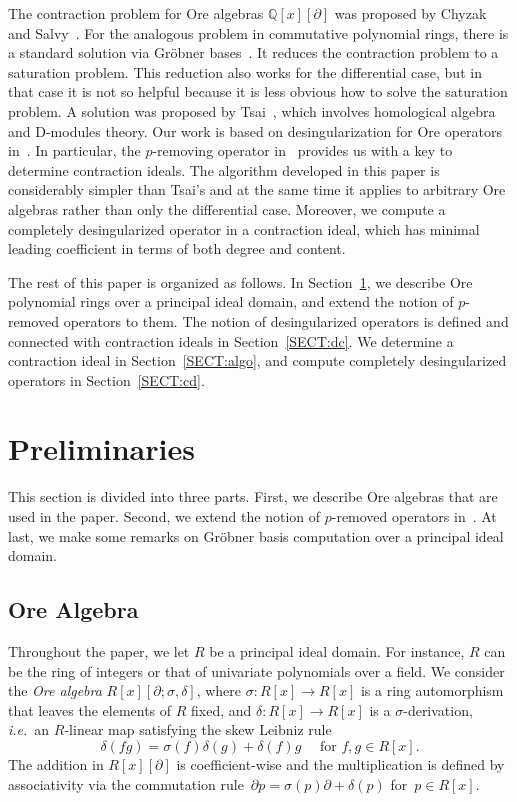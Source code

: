 \documentclass{sig-alternate}
\newcommand{\bQ} { {\mathbb{Q}}}
\newcommand{\pa}{\partial}
\newcommand{\ie}{{\it i.e.}}
\begin{document}
The contraction problem for Ore algebras $\bQ[x][\pa]$ was proposed by Chyzak and Salvy~\cite[Section 4.3]{Salvy1998}.
For the analogous problem in
commutative polynomial rings, there is a standard solution via
Gr\"obner bases~\cite[Section 8.7]{Weispfenning1993}. It reduces the contraction problem to
a saturation problem. This reduction also works for the differential
case, but in that case it is not so helpful because it is less obvious
how to solve the saturation problem. A solution was proposed by
Tsai~\cite{Tsai2000}, which involves homological algebra and D-modules theory.
Our work is based on desingularization for Ore operators in~\cite{Chen2013,Chen2016}.
In particular, the $p$-removing operator in~\cite[Lemma~4]{Chen2016} provides us with a key
to determine contraction ideals. The algorithm developed in this paper is
considerably simpler than Tsai's and at the same time it applies to
arbitrary Ore algebras rather than only the differential case.
Moreover, we compute a completely desingularized operator in a contraction ideal, which
has minimal leading coefficient in terms of both degree and content.

The rest of this paper is organized as follows. In Section~\ref{SECT:PRE},
we describe Ore polynomial rings over a principal ideal domain, and extend the notion
of $p$-removed operators to them.  The notion of desingularized operators is defined and connected
with contraction ideals in Section~\ref{SECT:dc}. We determine a contraction ideal
in Section~\ref{SECT:algo}, and compute completely desingularized operators
in Section~\ref{SECT:cd}.

\section{Preliminaries}\label{SECT:PRE}

This section is divided into three parts. First, we describe Ore algebras that are used in the paper.
Second, we extend the notion of $p$-removed operators in~\cite{Chen2013,Chen2016}. At last, we
make some remarks  on Gr\"obner basis computation over a principal ideal domain.

\subsection{Ore Algebra}
Throughout the paper, we let $R$ be a principal ideal domain. For instance, $R$ can be
the ring of integers or that of univariate polynomials over a field.
We consider the \emph{Ore algebra}
$R[x][\pa; \sigma, \delta]$, where $\sigma: R[x] \rightarrow R[x]$ is a ring automorphism that leaves the
elements of $R$ fixed, and
$\delta: R[x] \rightarrow R[x]$ is a $\sigma$-derivation, \ie ~an $R$-linear map satisfying the skew Leibniz rule
$$\delta(fg) = \sigma(f)\delta(g) + \delta(f)g \quad \text{ for } f, g \in R[x].$$
The addition in $R[x][\pa]$ is coefficient-wise and the
multiplication is defined by associativity via the commutation rule~$\pa p = \sigma(p) \pa + \delta(p)$
for~$p \in R[x].$
\end{document}
